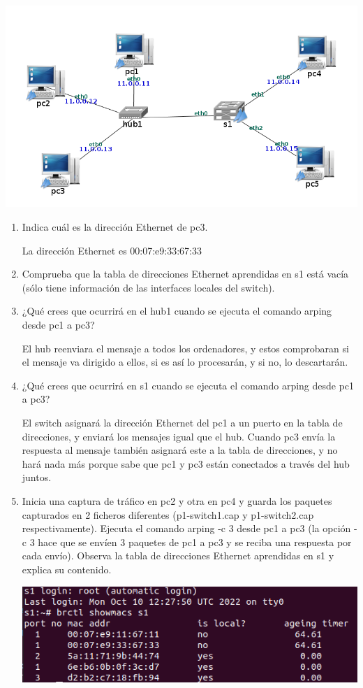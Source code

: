 \documentclass[12pt, a4paper]{report}
\begin{document}
\includegraphics*[scale=0.5, center]{enunciado4}
\begin{enumerate}
	\item Indica cuál es la dirección Ethernet de pc3.
	
	La dirección Ethernet es 00:07:e9:33:67:33
	\item Comprueba que la tabla de direcciones Ethernet aprendidas en s1 está vacía (sólo tiene información de las
	interfaces locales del switch).
	\item ¿Qué crees que ocurrirá en el hub1 cuando se ejecuta el comando arping desde pc1 a pc3?
	
	El hub reenviara el mensaje a todos los ordenadores, y estos comprobaran si el mensaje va dirigido a ellos, si es así lo procesarán, y si no, lo descartarán.
	\item ¿Qué crees que ocurrirá en s1 cuando se ejecuta el comando arping desde pc1 a pc3?
	
	El switch asignará la dirección Ethernet del pc1 a un puerto en la tabla de direcciones, y enviará los mensajes igual que el hub.
	Cuando pc3 envía la respuesta al mensaje también asignará este a la tabla de direcciones, y no hará nada más porque sabe que pc1 y pc3 están conectados a través del hub juntos.
	\item Inicia una captura de tráfico en pc2 y otra en pc4 y guarda los paquetes capturados en 2 ficheros diferentes
	(p1-switch1.cap y p1-switch2.cap respectivamente). Ejecuta el comando arping -c 3 desde pc1 a pc3 (la
	opción -c 3 hace que se envíen 3 paquetes de pc1 a pc3 y se reciba una respuesta por cada envío). Observa
	la tabla de direcciones Ethernet aprendidas en s1 y explica su contenido.
	
	\includegraphics*[width=128mm, scale=0.5,center]{screenshot1}
	

\end{enumerate}
\end{document}
